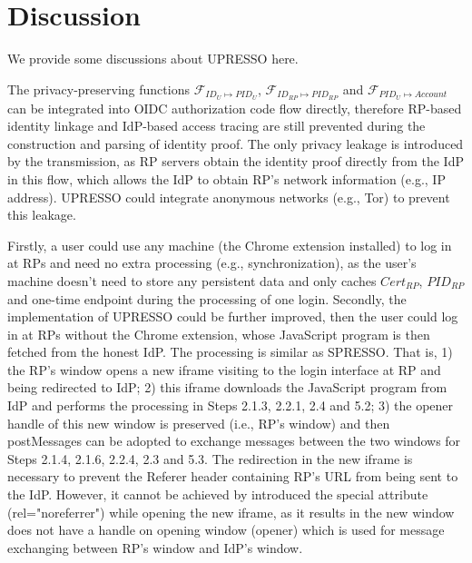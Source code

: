 \section{Discussion}
\label{sec:discussion}
We provide some discussions about UPRESSO here.

 The privacy-preserving functions $\mathcal{F}_{ID_{U} \mapsto PID_{U}}$, $\mathcal{F}_{ID_{RP} \mapsto PID_{RP}}$ and $\mathcal{F}_{PID_{U} \mapsto Account}$ can be integrated into OIDC authorization code flow directly, therefore  RP-based identity linkage and IdP-based access tracing are still prevented during the construction and parsing of identity proof.
The only privacy leakage is introduced by the transmission, as RP servers obtain the identity proof directly from the IdP in this flow, which allows the IdP to obtain RP's network information (e.g., IP address).
UPRESSO could integrate anonymous networks (e.g., Tor)  to prevent this leakage.



Firstly, a user could use any machine (the Chrome extension installed) to log in at RPs and need no extra processing (e.g., synchronization),
as the user's machine doesn't need to store any persistent data and only caches $Cert_{RP}$, $PID_{RP}$ and one-time endpoint during the processing of one login.
Secondly, the implementation of UPRESSO could  be further improved, then the user could  log in at RPs without the Chrome extension, whose JavaScript program is then fetched from the honest IdP. The processing is similar as SPRESSO. That is, 1) the RP's window opens a new iframe  visiting to the login interface at RP and being redirected to IdP; 2) this iframe downloads the JavaScript  program from IdP and performs the processing in Steps 2.1.3, 2.2.1, 2.4 and 5.2; 3) the opener handle of this new window is preserved (i.e., RP's window) and then postMessages can be adopted to exchange messages between the two windows for Steps 2.1.4, 2.1.6, 2.2.4, 2.3 and 5.3. The redirection in the new iframe is necessary to prevent the Referer header containing RP's URL from being sent to the IdP. However, it cannot be achieved by introduced the special attribute (rel="noreferrer") while opening the new iframe, as it results in the new window does not have a handle on opening window (opener) which is used for message exchanging between RP's window and IdP's window.

